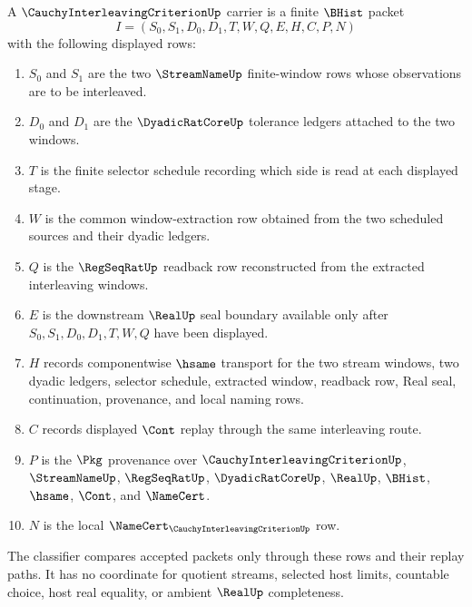 \begin{definition}
\label{def:cauchy-interleaving-criterion-carrier}
A $\CauchyInterleavingCriterionUp$ carrier is a finite $\BHist$ packet
$$
I=(S_0,S_1,D_0,D_1,T,W,Q,E,H,C,P,N)
$$
with the following displayed rows:
\begin{enumerate}
\item $S_0$ and $S_1$ are the two $\StreamNameUp$ finite-window rows whose observations are to be interleaved.
\item $D_0$ and $D_1$ are the $\DyadicRatCoreUp$ tolerance ledgers attached to the two windows.
\item $T$ is the finite selector schedule recording which side is read at each displayed stage.
\item $W$ is the common window-extraction row obtained from the two scheduled sources and their dyadic ledgers.
\item $Q$ is the $\RegSeqRatUp$ readback row reconstructed from the extracted interleaving windows.
\item $E$ is the downstream $\RealUp$ seal boundary available only after $S_0,S_1,D_0,D_1,T,W,Q$ have been displayed.
\item $H$ records componentwise $\hsame$ transport for the two stream windows, two dyadic ledgers, selector schedule, extracted window, readback row, Real seal, continuation, provenance, and local naming rows.
\item $C$ records displayed $\Cont$ replay through the same interleaving route.
\item $P$ is the $\Pkg$ provenance over $\CauchyInterleavingCriterionUp$, $\StreamNameUp$, $\RegSeqRatUp$, $\DyadicRatCoreUp$, $\RealUp$, $\BHist$, $\hsame$, $\Cont$, and $\NameCert$.
\item $N$ is the local $\NameCert_{\CauchyInterleavingCriterionUp}$ row.
\end{enumerate}
The classifier compares accepted packets only through these rows and their replay paths. It has no coordinate for quotient streams, selected host limits, countable choice, host real equality, or ambient $\RealUp$ completeness.
\end{definition}

